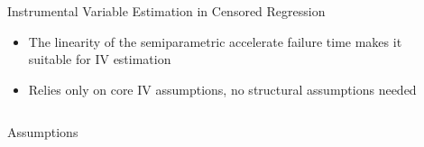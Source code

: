 \documentclass[final,plain]{beamer}
\newlength{\sepwid}
\newlength{\onecolwid}
\newlength{\twocolwid}
\newcommand{\bi}{\begin{itemize}}
\newcommand{\ei}{\end{itemize}}
\begin{document}
\begin{frame}[t]
\begin{columns}[t]
\begin{column}{\onecolwid}
  \end{column}

  \begin{column}{\sepwid} \end{column} %

  \begin{column}{\twocolwid}
    \begin{exampleblock}{\Large Instrumental Variable Estimation in Censored Regression}{

	    	\begin{center}
    		\begin{minipage}[t]{0.8\onecolwid}
    		\vspace*{0mm}

   		 \bi
   		 \item The linearity of the semiparametric accelerate failure time makes it suitable for IV estimation
   		 \ei

   		 \end{minipage}
   		 \hspace{0.5\sepwid}
   		 \begin{minipage}[t]{0.8\onecolwid}
   		 \vspace*{0mm}

    		\bi
   		 \item Relies only on core IV assumptions, no structural assumptions needed
   		 \ei

    		\end{minipage} \end{center}

	}
    \end{exampleblock}

    \vspace{1mm} %

    \begin{columns}[t]

  \begin{column}{\onecolwid}

    \begin{block}{\Large Assumptions}{

}
\end{block}
\end{column}
\end{columns}
\end{column}
\end{columns}
\end{frame}
\end{document}
